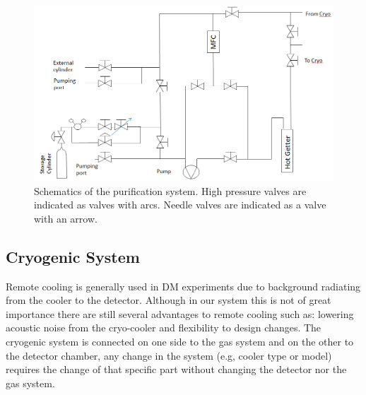 \begin{figure}[t!]
\centerline{\includegraphics[width=1.\linewidth]{GasSchematics.png}}
\caption{Schematics of the purification system. High pressure valves are indicated as valves with arcs. Needle valves are indicated as a valve with an arrow.}
\label{fig:gasSchematic}
\end{figure}
\subsection{Cryogenic System}
\label{subsec:cryo}

Remote cooling is generally used in DM experiments due to background radiating from the cooler to the detector. Although in our system this is not of great importance there are still several advantages to remote cooling such as: lowering acoustic noise from the cryo-cooler and flexibility to design changes. The cryogenic system is connected on one side to the gas system and on the other to the detector chamber, any change in the system (e.g, cooler type or model) requires the change of that specific part without changing the detector nor the gas system.

